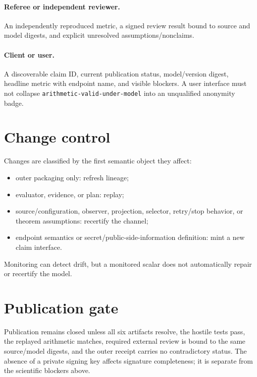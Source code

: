 \documentclass[11pt]{article}
\begin{document}
\paragraph{Referee or independent reviewer.}
An independently reproduced metric, a signed review result bound to source and model digests, and explicit unresolved assumptions/nonclaims.

\paragraph{Client or user.}
A discoverable claim ID, current publication status, model/version digest, headline metric with endpoint name, and visible blockers. A user interface must not collapse \texttt{arithmetic-valid-under-model} into an unqualified anonymity badge.

\section{Change control}\label{sec:change}
Changes are classified by the first semantic object they affect:
\begin{itemize}[leftmargin=*]
\item outer packaging only: refresh lineage;
\item evaluator, evidence, or plan: replay;
\item source/configuration, observer, projection, selector, retry/stop behavior, or theorem assumptions: recertify the channel;
\item endpoint semantics or secret/public-side-information definition: mint a new claim interface.
\end{itemize}
Monitoring can detect drift, but a monitored scalar does not automatically repair or recertify the model.\cite{series:evalnotary,series:advantagecontracts,series:planstateequiv}

\section{Publication gate}\label{sec:publication}
Publication remains closed unless all six artifacts resolve, the hostile tests pass, the replayed arithmetic matches, required external review is bound to the same source/model digests, and the outer receipt carries no contradictory status. The absence of a private signing key affects signature completeness; it is separate from the scientific blockers above.
\end{document}
